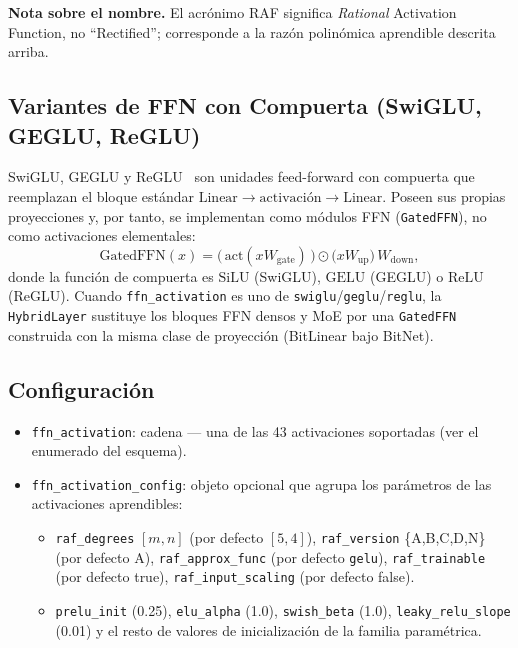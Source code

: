 \textbf{Nota sobre el nombre.} El acrónimo RAF significa \emph{Rational}
Activation Function, no ``Rectified''; corresponde a la razón polinómica
aprendible descrita arriba.

\subsection{Variantes de FFN con Compuerta (SwiGLU, GEGLU, ReGLU)}
\label{sec:glu-es}

SwiGLU, GEGLU y ReGLU~\citep{shazeer2020glu} son unidades feed-forward con
compuerta que reemplazan el bloque estándar
$\text{Linear}\to\text{activación}\to\text{Linear}$. Poseen sus propias
proyecciones y, por tanto, se implementan como módulos FFN
(\texttt{GatedFFN}), no como activaciones elementales:
\[
\text{GatedFFN}(x) = \big(\,\text{act}(xW_{\text{gate}})\,\big) \odot \big(xW_{\text{up}}\big)\, W_{\text{down}},
\]
donde la función de compuerta es $\text{SiLU}$ (SwiGLU), $\text{GELU}$
(GEGLU) o $\text{ReLU}$ (ReGLU). Cuando \texttt{ffn\_activation} es uno de
\texttt{swiglu}/\texttt{geglu}/\texttt{reglu}, la \texttt{HybridLayer} sustituye
los bloques FFN densos y MoE por una \texttt{GatedFFN} construida con la misma
clase de proyección (BitLinear bajo BitNet).

\subsection{Configuración}

\begin{itemize}[leftmargin=*]
    \item \texttt{ffn\_activation}: cadena --- una de las 43 activaciones soportadas (ver el enumerado del esquema).
    \item \texttt{ffn\_activation\_config}: objeto opcional que agrupa los parámetros de las activaciones aprendibles:
    \begin{itemize}
        \item \texttt{raf\_degrees} $[m,n]$ (por defecto $[5,4]$), \texttt{raf\_version} \{A,B,C,D,N\} (por defecto A),
        \texttt{raf\_approx\_func} (por defecto \texttt{gelu}), \texttt{raf\_trainable} (por defecto true),
        \texttt{raf\_input\_scaling} (por defecto false).
        \item \texttt{prelu\_init} (0.25), \texttt{elu\_alpha} (1.0), \texttt{swish\_beta} (1.0),
        \texttt{leaky\_relu\_slope} (0.01) y el resto de valores de inicialización de la familia paramétrica.
    \end{itemize}
\end{itemize}
